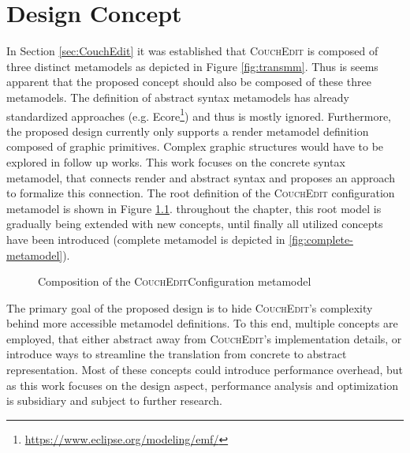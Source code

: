 \chapter{Design Concept}
\label{chap:design}
In Section \ref{sec:CouchEdit} it was established that \textsc{CouchEdit} is composed of three distinct metamodels as depicted in Figure \ref{fig:transmm}. Thus is seems apparent that the proposed concept should also be composed of these three metamodels. The definition of abstract syntax metamodels has already standardized approaches (e.g. Ecore\footnote{\url{https://www.eclipse.org/modeling/emf/}}) and thus is mostly ignored. Furthermore, the proposed design currently only supports a render metamodel definition composed of graphic primitives. Complex graphic structures would have to be explored in follow up works. This work focuses on the concrete syntax metamodel, that connects render and abstract syntax and proposes an approach to formalize this connection. The root definition of the \textsc{CouchEdit} configuration metamodel is shown in Figure \ref{fig:metamodel-base}. throughout the chapter, this root model is gradually being extended with new concepts, until finally all utilized concepts have been introduced (complete metamodel is depicted in \ref{fig:complete-metamodel}).

\begin{figure}
  \centering
  
  \caption{Composition of the \textsc{CouchEdit}Configuration metamodel}
  \label{fig:metamodel-base}
\end{figure}

The primary goal of the proposed design is to hide \textsc{CouchEdit}'s complexity behind more accessible metamodel definitions. To this end, multiple concepts are employed, that either abstract away from \textsc{CouchEdit}'s implementation details, or introduce ways to streamline the translation from concrete to abstract representation. Most of these concepts could introduce performance overhead, but as this work focuses on the design aspect, performance analysis and optimization is subsidiary and subject to further research.

